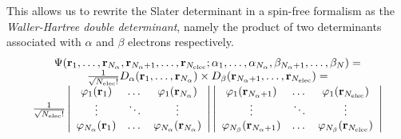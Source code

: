 \documentclass[./thesis.tex]{subfiles}
\begin{document}
This allows us to rewrite the Slater determinant in a spin-free formalism as
the \emph{Waller-Hartree double determinant},\cite{Pauncz_1989} namely the
product of two determinants associated with $\alpha$ and $\beta$ electrons
respectively.
\begin{equation}
\begin{array}{c}
 \Psi({\bf r}_1,\dots,{\bf r}_{{N_\alpha}},{\bf r}_{{N_\alpha}+1},\dots,{\bf r}_{N_\text{elec}};
      \alpha_1,\dots,\alpha_{{N_\alpha}},\beta_{{N_\alpha}+1},\dots,\beta_N) = \\
\frac{1}{\sqrt{{N_\text{elec}}!}} D_\alpha({\bf r}_1,\dots,{\bf r}_{{N_\alpha}}) \times D_\beta({\bf r}_{{N_\alpha}+1},\dots,{\bf r}_{N_\text{elec}}) = \\
\frac{1}{\sqrt{{N_\text{elec}}!}} \left|
 \begin{array}{ccc}
 \varphi_1({\bf r}_1) & \dots & \varphi_1({\bf r}_{{N_\alpha}}) \\
 \vdots               & \ddots &   \vdots             \\
 \varphi_{{N_\alpha}}({\bf r}_1) & \dots & \varphi_{{N_\alpha}}({\bf r}_{{N_\alpha}}) \\
 \end{array}
\right|
\left|
 \begin{array}{ccc}
 \varphi_1({\bf r}_{{N_\alpha}+1}) & \dots & \varphi_1({\bf r}_{{N_\text{elec}}}) \\
 \vdots               & \ddots &   \vdots             \\
 \varphi_{N_\beta}({\bf r}_{{N_\alpha}+1}) & \dots & \varphi_{N_\beta}({\bf r}_{{N_\text{elec}}}) \\
 \end{array}
\right| \\ 
\end{array} \\
\label{eq:slater}
\end{equation}
\end{document}
